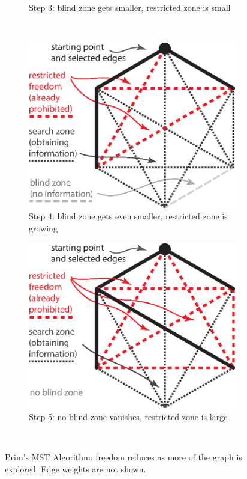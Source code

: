 \begin{figure}[th!]
\begin{subfigure}[b]{.48\textwidth}
            \caption{Step 3: blind zone gets smaller, restricted zone is small}
            \label{fig:mst_illustration-1}
        \end{subfigure}
        \\[.5cm]
        \begin{subfigure}[b]{.48\textwidth}
            \includegraphics[width=\linewidth]{figures/ch_introduction/mst_illustration_2}
            \caption{Step 4: blind zone gets even smaller, restricted zone is growing}
            \label{fig:mst_illustration-2}
        \end{subfigure}
        \hfill
        \begin{subfigure}[b]{.48\textwidth}
            \includegraphics[width=\linewidth]{figures/ch_introduction/mst_illustration_3}
            \caption{Step 5: no blind zone vanishes, restricted zone is large}
            \label{fig:mst_illustration-3}
        \end{subfigure}
        \\[.5cm]
        \caption{Prim's MST Algorithm: freedom reduces as more of the graph is
          explored. Edge weights are not shown.}
        \label{fig:mst_illustration}
\end{figure}

